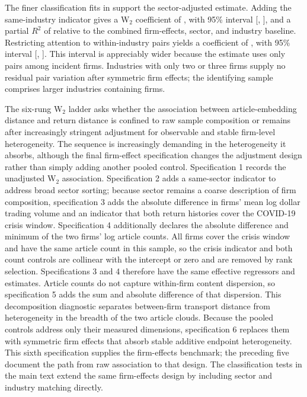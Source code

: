 The finer classification fits in  support
the sector-adjusted estimate.
Adding the same-industry indicator gives a W$_2$ coefficient of
, with 95\% interval
[,
], and a partial $R^2$ of
 relative to the combined
firm-effects, sector, and industry baseline.
Restricting attention to within-industry pairs yields a coefficient of
, with 95\% interval
[,
].
This interval is appreciably wider because the estimate uses only
 pairs among
 incident firms.
Industries with only two or three firms supply no residual pair variation
after symmetric firm effects; the identifying sample comprises
 larger industries containing
 firms.

The six-rung W$_2$ ladder asks whether the association between
article-embedding distance and return distance is confined to raw sample
composition or remains after increasingly stringent adjustment for observable
and stable firm-level heterogeneity.
The sequence is increasingly demanding in the heterogeneity it absorbs,
although the final firm-effect specification changes the adjustment design
rather than simply adding another pooled control.
Specification 1 records the unadjusted W$_2$ association.
Specification 2 adds a same-sector indicator to address broad sector sorting;
because sector remains a coarse description of firm composition,
specification 3 adds the absolute difference in firms' mean log dollar
trading volume and an indicator that both return histories cover the
COVID-19 crisis window.
Specification 4 additionally declares the absolute difference and minimum
of the two firms' log article counts.
All firms cover the crisis window and have the same article count in this
sample, so the crisis indicator and both count controls are collinear with
the intercept or zero and are removed by rank selection.
Specifications 3 and 4 therefore have the same effective regressors
and estimates.
Article counts do not capture within-firm content dispersion, so
specification 5 adds the sum and absolute difference of that dispersion.
This decomposition diagnostic separates between-firm transport distance from
heterogeneity in the breadth of the two article clouds.
Because the pooled controls address only their measured dimensions,
specification 6 replaces them with symmetric firm effects that absorb stable
additive endpoint heterogeneity.
This sixth specification supplies the firm-effects benchmark; the preceding
five document the path from raw association to that design.
The classification tests in the main text extend the same firm-effects
design by including sector and industry matching directly.

